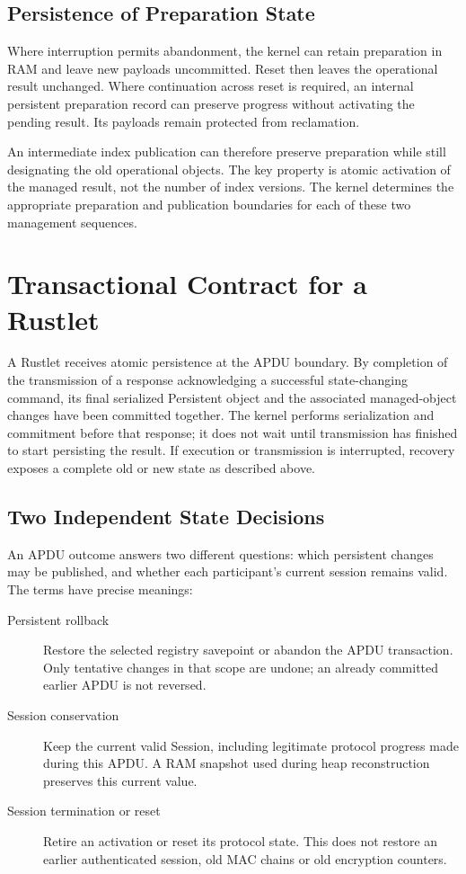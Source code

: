 \subsection{Persistence of Preparation State}

Where interruption permits abandonment, the kernel can retain preparation in
RAM and leave new payloads uncommitted. Reset then leaves the operational
result unchanged. Where continuation across reset is required, an internal
persistent preparation record can preserve progress without activating the
pending result. Its payloads remain protected from reclamation.

An intermediate index publication can therefore preserve preparation while
still designating the old operational objects. The key property is atomic
activation of the managed result, not the number of index versions. The
kernel determines the appropriate preparation and publication boundaries for
each of these two management sequences.

\section{Transactional Contract for a Rustlet}
\label{sec:registry-rustlet-transactions}

A Rustlet receives atomic persistence at the APDU boundary. By completion of
the transmission of a response acknowledging a successful state-changing
command, its final serialized Persistent object and the associated managed-object changes
have been committed together. The kernel performs serialization and commitment
before that response; it does not wait until transmission has finished to
start persisting the result. If execution or transmission is interrupted,
recovery exposes a complete old or new state as described above.

\subsection{Two Independent State Decisions}
\label{subsec:registry-state-transitions}

An APDU outcome answers two different questions: which persistent changes
may be published, and whether each participant's current session remains
valid. The terms have precise meanings:
\begin{description}
\item[Persistent rollback] Restore the selected registry savepoint or abandon
  the APDU transaction. Only tentative changes in that scope are undone;
  an already committed earlier APDU is not reversed.
\item[Session conservation] Keep the current valid Session, including
  legitimate protocol progress made during this APDU. A RAM snapshot used
  during heap reconstruction preserves this current value.
\item[Session termination or reset] Retire an activation or reset its
  protocol state. This does not restore an earlier authenticated session,
  old MAC chains or old encryption counters.
\end{description}

